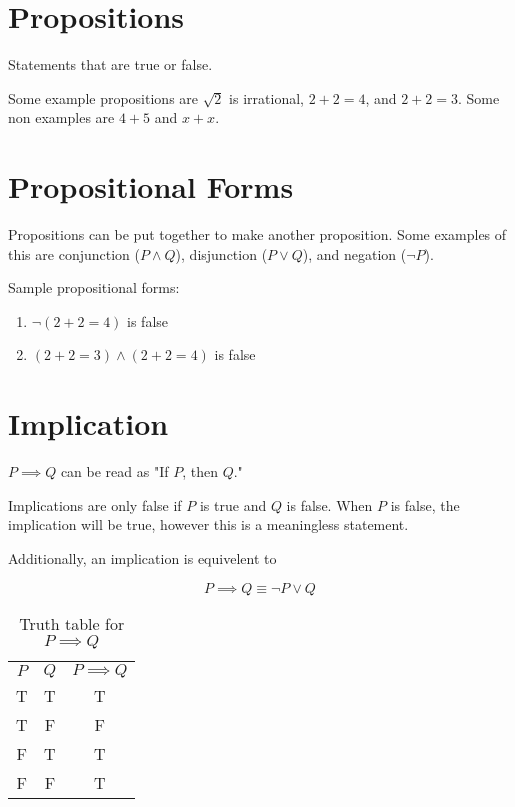 
\section{Propositions}
\begin{definition}[Propositions]
  Statements that are true or false.
\end{definition}

Some example propositions are $\sqrt{2}$ is irrational, $2+2=4$, and $2+2=3$.
Some non examples are $4+5$ and $x+x$.
\section{Propositional Forms}
Propositions can be put together to make another proposition. Some examples of
this are conjunction ($P \land Q$), disjunction ($P \lor Q$), and negation ($\lnot P$).

\begin{example}
  Sample propositional forms:
\begin{enumerate}
  \item $\lnot (2+2=4)$ is false
  \item $(2+2=3)\land (2+2=4)$ is false
\end{enumerate}
\end{example}

\section{Implication}
\begin{definition}[Implication]
  $P \implies Q$ can be read as "If $P$, then $Q$."

  Implications are only false if $P$ is true and $Q$ is false. When $P$ is false,
  the implication will be true, however this is a meaningless statement.
  
  Additionally, an implication is equivelent to

  \begin{equation}
    P \implies Q \equiv \lnot P \lor Q
  \end{equation}
  \begin{table}[htpb]
    \centering
    \caption{Truth table for $P \implies Q$}
    \label{tab:label}
    \begin{tabular}{|c|c|c|}
      $P$ & $Q$ & $P \implies Q$ \\
      T & T & T \\
      T & F & F \\
      F & T & T \\
      F & F & T
    \end{tabular}
  \end{table}
\end{definition}

